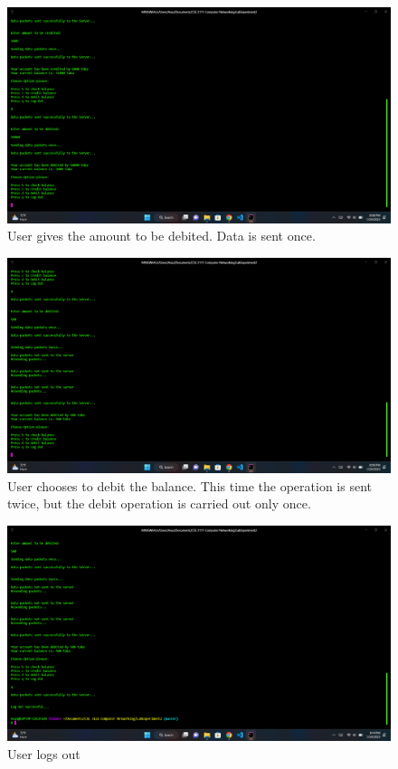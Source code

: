 \documentclass[11pt]{article}
\begin{document}
\newpage

\begin{figure}[!h]
\centering
\includegraphics[width=\textwidth]{125.png}
\caption{User gives the amount to be debited. Data is sent once.}
\end{figure}



\begin{figure}[!h]
\centering
\includegraphics[width=\textwidth]{126.png}
\caption{User chooses to debit the balance. This time the operation is sent twice, but the debit operation is carried out only once.}
\end{figure}

\newpage

\begin{figure}[!h]
\centering
\includegraphics[width=\textwidth]{127.png}
\caption{User logs out}
\end{figure}
\end{document}
